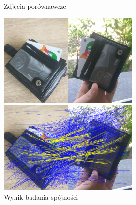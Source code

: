 \documentclass[../main.tex]{subfiles}
\begin{document}
    \begin{figure}[H]
    \centering
    \begin{minipage}{.5\textwidth}
        \caption{Zdjęcia porównawcze}
        \centering
        \includegraphics[width=7cm]{wallet_clean_out}
    \end{minipage}%
    \begin{minipage}{.5\textwidth}
        \caption{Wynik badania spójności}
        \centering
        \includegraphics[width=7cm]{wallet_pairs_conspairs_out}
    \end{minipage}%
    \end{figure}
\end{document}
